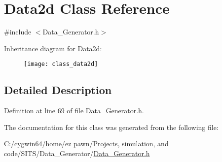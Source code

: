 \hypertarget{class_data2d}{}\section{Data2d Class Reference}
\label{class_data2d}


{\ttfamily \#include $<$Data\+\_\+\+Generator.\+h$>$}

Inheritance diagram for Data2d\+:\begin{figure}[H]
\begin{center}
\leavevmode
\texttt{[image: class\_data2d]}
\end{center}
\end{figure}


\subsection{Detailed Description}


Definition at line 69 of file Data\+\_\+\+Generator.\+h.



The documentation for this class was generated from the following file\+:\begin{DoxyCompactItemize}
\item 
C\+:/cygwin64/home/ez pawn/\+Projects, simulation, and code/\+S\+I\+T\+S/\+Data\+\_\+\+Generator/\hyperlink{_data___generator_8h}{Data\+\_\+\+Generator.\+h}\end{DoxyCompactItemize}
